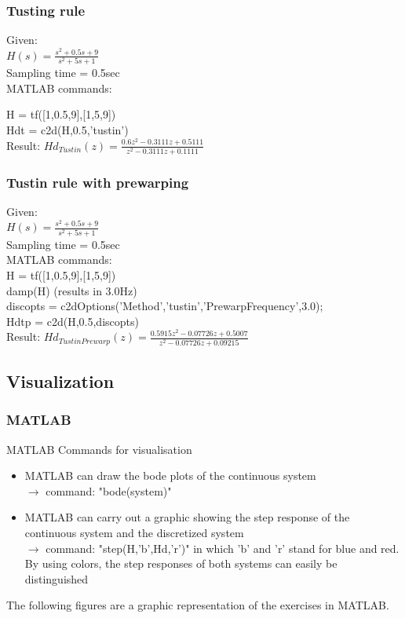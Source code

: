 \begin{frame}
	\frametitle{Tusting rule}
	\begin{example}
		Given:\\
		$H(s) = \frac{s^{2} + 0.5s + 9}{s^{2} + 5s + 1}$\\
		Sampling time = 0.5sec\\
		\vspace{1em}
		MATLAB commands:
		
		H = tf([1,0.5,9],[1,5,9]) \\
		Hdt = c2d(H,0.5,'tustin')\\
		\vspace{1em}
		Result: 
		$Hd_{Tustin}(z) = \frac{0.6z^{2} - 0.3111z + 0.5111}{z^{2} -  0.3111z + 0.1111}$
	\end{example}
\end{frame}

\begin{frame}
	\frametitle{Tustin rule with prewarping}
	\begin{example}
		Given:\\
		$H(s) = \frac{s^{2} + 0.5s + 9}{s^{2} + 5s + 1}$\\
		Sampling time = 0.5sec\\
		\vspace{1em}
		MATLAB commands:\\
		H = tf([1,0.5,9],[1,5,9])\\
		damp(H) (results in 3.0Hz)\\
		discopts = c2dOptions('Method','tustin','PrewarpFrequency',3.0);\\
		Hdtp = c2d(H,0.5,discopts)\\
		\vspace{1em}
		Result:
		$Hd_{TustinPrewarp}(z) = \frac{0.5915z^{2} - 0.07726z + 0.5007}{z^{2} - 0.07726z + 0.09215}$
	\end{example}
\end{frame}

\subsection{Visualization}
\begin{frame}
	\frametitle{MATLAB}
	\begin{block}{MATLAB Commands for visualisation}
		\begin{itemize}
			\item MATLAB can draw the bode plots of the continuous system\\ 
			$\rightarrow$ command: "bode(system)"
			\item MATLAB can carry out a graphic showing the step response of the continuous system and the discretized system\\
			$\rightarrow$ command: "step(H,'b',Hd,'r')" in which 'b' and 'r' stand for blue and red. By using colors, the step responses of both systems can easily be distinguished
		\end{itemize}
		The following figures are a graphic representation of the exercises in MATLAB.
	\end{block}
\end{frame}

